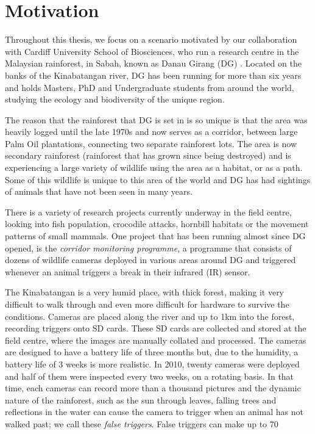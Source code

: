 \section{Motivation}\label{int:mot}
Throughout this thesis, we focus on a scenario motivated by our collaboration with Cardiff University School of Biosciences, who run a research centre in the Malaysian rainforest, in Sabah, known as Danau Girang (DG) . Located on the banks of the Kinabatangan river, DG has been running for more than six years and holds Masters, PhD and Undergraduate students from around the world, studying the ecology and biodiversity of the unique region.

The reason that the rainforest that DG is set in is so unique is that the area was heavily logged until the late 1970s and now serves as a corridor, between large Palm Oil plantations, connecting two separate rainforest lots. The area is now secondary rainforest (rainforest that has grown since being destroyed) and is experiencing a large variety of wildlife using the area as a habitat, or as a path. Some of this wildlife is unique to this area of the world and DG has had sightings of animals that have not been seen in many years.

There is a variety of research projects currently underway in the field centre, looking into fish population, crocodile attacks, hornbill habitats or the movement patterns of small mammals. One project that has been running almost since DG opened, is the \textit{corridor monitoring programme}, a programme that consists of dozens of wildlife cameras deployed in various areas around DG and triggered whenever an animal triggers a break in their infrared (IR)  sensor.

The Kinabatangan is a very humid place, with thick forest, making it very difficult to walk through and even more difficult for hardware to survive the conditions. Cameras are placed along the river and up to 1km into the forest, recording triggers onto SD cards. These SD cards are collected and stored at the field centre, where the images are manually collated and processed. The cameras are designed to have a battery life of three months but, due to the humidity, a battery life of 3 weeks is more realistic. In 2010, twenty cameras were deployed and half of them were inspected every two weeks, on a rotating basis. In that time, each cameras can record more than a thousand pictures and the dynamic nature of the rainforest, such as the sun through leaves, falling trees and reflections in the water can cause the camera to trigger when an animal has not walked past; we call these \textit{false triggers}. False triggers can make up to 70%

